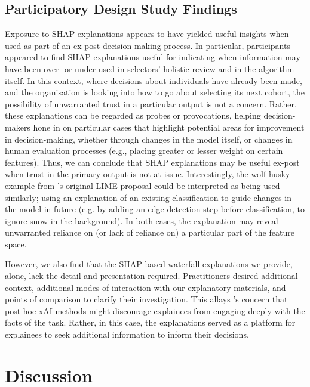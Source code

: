 \subsection{Participatory Design Study Findings}\label{ssec:cs_discussion}
Exposure to SHAP explanations appears to have yielded useful insights when used as part of an ex-post decision-making process. In particular, participants appeared to find SHAP explanations useful for indicating when information may have been over- or under-used in selectors' holistic review and in the algorithm itself. In this context, where decisions about individuals have already been made, and the organisation is looking into how to go about selecting its next cohort, the possibility of unwarranted trust in a particular output is not a concern. Rather, these explanations can be regarded as probes or provocations, helping decision-makers hone in on particular cases that highlight potential areas for improvement in decision-making, whether through changes in the model itself, or changes in human evaluation processes (e.g., placing greater or lesser weight on certain features). Thus, we can conclude that SHAP explanations may be useful ex-post when trust in the primary output is not at issue. Interestingly, the wolf-husky example from \textcite{ribeiro_why_2016}'s original LIME proposal could be interpreted as being used similarly; using an explanation of an existing classification to guide changes in the model in future (e.g. by adding an edge detection step before classification, to ignore snow in the background). In both cases, the explanation may reveal unwarranted reliance on (or lack of reliance on) a particular part of the feature space.

However, we also find that the SHAP-based waterfall explanations we provide, alone, lack the detail and presentation required. Practitioners desired additional context, additional modes of interaction with our explanatory materials, and points of comparison to clarify their investigation. This allays \textcite{miller_explainable_2023}'s concern that post-hoc xAI methods might discourage explainees from engaging deeply with the facts of the task. Rather, in this case, the explanations served as a platform for explainees to seek additional information to inform their decisions.

\section{Discussion}
